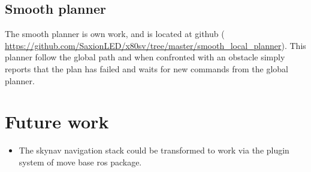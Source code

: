 \documentclass[a4paper]{article}
\begin{document}
\subsection{Smooth planner}
The smooth planner is own work, and is located at github (
\url{https://github.com/SaxionLED/x80sv/tree/master/smooth_local_planner}).
This planner follow the global path and when confronted with an obstacle simply
reports that the plan has failed and waits for new commands from the global planner.

\section{Future work}

\begin{itemize}
  \item The skynav navigation stack could be transformed to work via the plugin system of move base ros package.
\end{itemize}
\end{document}
